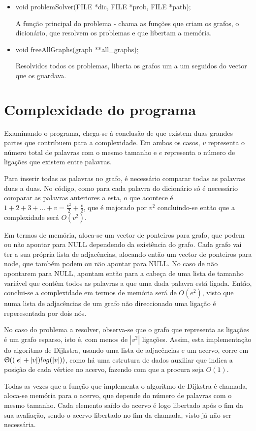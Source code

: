\documentclass[a4paper, 11pt]{article}
\begin{document}
\begin{itemize}
    \item void problemSolver(FILE *dic, FILE *prob, FILE *path);
    \par A função principal do problema - chama as funções que criam os grafos, o dicionário, que resolvem os problemas e que libertam a memória.
    
    \item void freeAllGraphs(graph **all{\_}graphs);
    \par Resolvidos todos os problemas, liberta os grafos um a um seguidos do vector que os guardava.
    
    \end{itemize}

\section{Complexidade do programa}
    \par Examinando o programa, chega-se à conclusão de que existem duas grandes partes que contribuem para a complexidade. Em ambos os casos, $v$ representa o número total de palavras com o mesmo tamanho e $e$ representa o número de ligações que existem entre palavras.
    \begin{description}[align=left]
        \item[Criação de grafo] Para inserir todas as palavras no grafo, é necessário comparar todas as palavras duas a duas. No código, como para cada palavra do dicionário só é necessário comparar as palavras anteriores a esta, o que acontece é $1 + 2 + 3 + ... + v = \frac{v^2}{2} + \frac{v}{2}$, que é majorado por $v^2$ concluindo-se então que a complexidade será $O(v^2)$.
        \par Em termos de memória, aloca-se um vector de ponteiros para grafo, que podem ou não apontar para NULL dependendo da existência do grafo. Cada grafo vai ter a sua própria lista de adjacências, alocando então um vector de ponteiros para node, que também podem ou não apontar para NULL. No caso de não apontarem para NULL, apontam então para a cabeça de uma lista de tamanho variável que contêm todos as palavras a que uma dada palavra está ligada. Então, conclui-se a complexidade em termos de memória será de $O(e^2)$, visto que numa lista de adjacências de um grafo não direccionado uma ligação é reperesentada por dois nós.
        \item[Algorítmo de Dijkstra] No caso do problema a resolver, observa-se que o grafo que representa as ligações é um grafo esparso, isto é, com menos de $|v^2|$ ligações. Assim, esta implementação do algoritmo de Dijkstra, usando uma lista de adjacências e um acervo, corre em $\Uptheta((|e| + |v|)log(|v|))$, como há uma estrutura de dados auxiliar que indica a posição de cada vértice no acervo, fazendo com que a procura seja $O(1)$.
        \par Todas as vezes que a função que implementa o algoritmo de Dijkstra é chamada, aloca-se memória para o acervo, que depende do número de palavras com o mesmo tamanho. Cada elemento saído do acervo é logo libertado após o fim da sua avaliação, sendo o acervo libertado no fim da chamada, visto já não ser necessária.
    \end{description}
\end{document}

